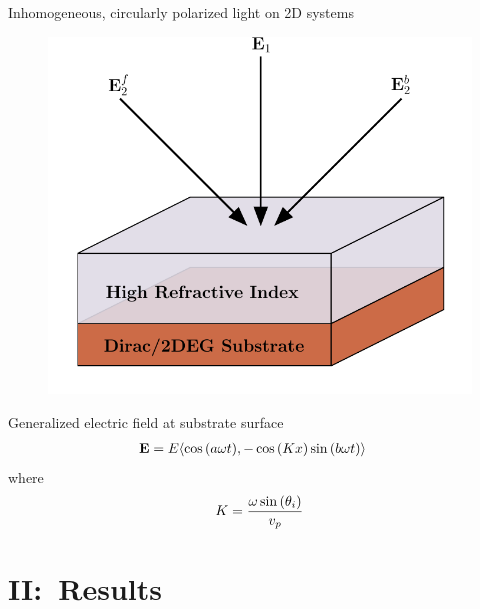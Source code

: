 \documentclass[xcolor=dvipsnames,10pt,aspectratio=169]{beamer}
\let\oldhat\hat
\renewcommand{\hat}[1]{\oldhat{\mathbf{#1}}}
\renewcommand{\vec}[1]{\mathbf{#1}}
\newcommand{\RE}{Results}
\begin{document}
  \begin{frame}{Inhomogeneous, circularly polarized light on 2D systems}
    \begin{figure}
      \includegraphics[height=0.4\textheight]{./figures/fll-setup.pdf}
    \end{figure}
    Generalized electric field at substrate surface
    \begin{align*}
      \small
      \vec{E} &= E \langle \cos{(a\omega t)},-\cos{(Kx)}\sin{(b\omega t)} \rangle
    \end{align*}
    where
    \begin{equation*}
      \small
      K = \frac{\omega \sin{(\theta_i)}}{v_p}
    \end{equation*}

  \end{frame}

  \section{II:\ \RE}
\end{document}
